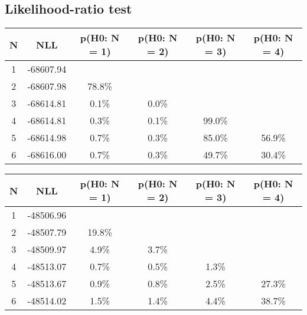 \subsection{Likelihood-ratio test}
\begin{table}[htb]
	\begin{center}
{\footnotesize\renewcommand{\arraystretch}{1.4}
		\begin{tabular}{cc||cccc}
			N & NLL & p(H0: N = 1) & p(H0: N = 2) & p(H0: N = 3) & p(H0: N = 4)\\ 
		\hline
1 & -68607.94 & & & & \\
2 & -68607.98 & 78.8\% & & & \\
3 & -68614.81 & 0.1\% & 0.0\% & & \\
4 & -68614.81 & 0.3\% & 0.1\% & 99.0\% & \\
5 & -68614.98 & 0.7\% & 0.3\% & 85.0\% & 56.9\% \\
6 & -68616.00 & 0.7\% & 0.3\% & 49.7\% & 30.4\% \\
	\end{tabular}
		\label{tab:lab}
	}
	\end{center}\end{table}

\begin{table}[htb]
	\begin{center}
{\footnotesize\renewcommand{\arraystretch}{1.4}
		\begin{tabular}{cc||cccc}
			N & NLL & p(H0: N = 1) & p(H0: N = 2) & p(H0: N = 3) & p(H0: N = 4)\\ 
		\hline
1 & -48506.96 & & & & \\
2 & -48507.79 & 19.8\% & & & \\
3 & -48509.97 & 4.9\% & 3.7\% & & \\
4 & -48513.07 & 0.7\% & 0.5\% & 1.3\% & \\
5 & -48513.67 & 0.9\% & 0.8\% & 2.5\% & 27.3\% \\
6 & -48514.02 & 1.5\% & 1.4\% & 4.4\% & 38.7\% \\
	\end{tabular}
		\label{tab:lab}
	}
	\end{center}\end{table}

